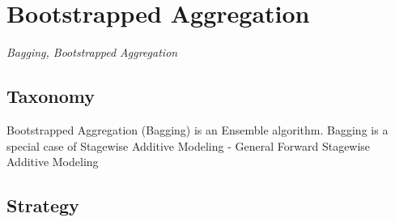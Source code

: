 
\section{Bootstrapped Aggregation} 
\label{sec:bagging}

\emph{Bagging, Bootstrapped Aggregation}

\subsection{Taxonomy}
Bootstrapped Aggregation (Bagging) is an Ensemble algorithm.
Bagging is a special case of Stagewise Additive Modeling - General Forward Stagewise Additive Modeling


\subsection{Strategy}

